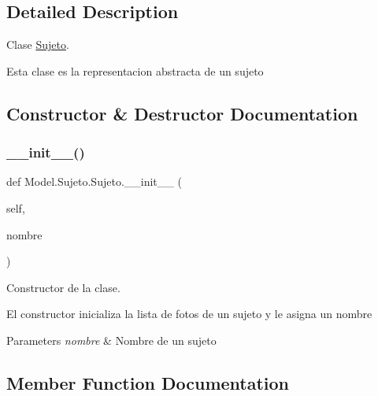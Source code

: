 \subsection{Detailed Description}
Clase \hyperlink{class_model_1_1_sujeto_1_1_sujeto}{Sujeto}. 

Esta clase es la representacion abstracta de un sujeto 

\subsection{Constructor \& Destructor Documentation}
\mbox{\label{class_model_1_1_sujeto_1_1_sujeto_a5f8c85184dd79e8515e94ce2b4788848}} 
\subsubsection{\texorpdfstring{\+\_\+\+\_\+init\+\_\+\+\_\+()}{\_\_init\_\_()}}
{\footnotesize\ttfamily def Model.\+Sujeto.\+Sujeto.\+\_\+\+\_\+init\+\_\+\+\_\+ (\begin{DoxyParamCaption}\item[{}]{self,  }\item[{}]{nombre }\end{DoxyParamCaption})}



Constructor de la clase. 

El constructor inicializa la lista de fotos de un sujeto y le asigna un nombre 
\begin{DoxyParams}{Parameters}
{\em nombre} & Nombre de un sujeto \\
\hline
\end{DoxyParams}


\subsection{Member Function Documentation}
\mbox{\label{class_model_1_1_sujeto_1_1_sujeto_ae634c9ff586c967fd085d0bcfee155e6}} 
